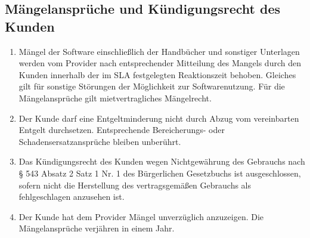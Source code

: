 \documentclass{terms}
\begin{document}
\subsection{Mängelansprüche und Kündigungsrecht des Kunden}
\begin{enumerate}
\item Mängel der Software einschließlich der Handbücher und sonstiger Unterlagen werden vom Provider nach entsprechender Mitteilung des Mangels durch den Kunden innerhalb der im SLA festgelegten Reaktionszeit behoben. Gleiches gilt für sonstige Störungen der Möglichkeit zur Softwarenutzung. Für die Mängelansprüche gilt mietvertragliches Mängelrecht.
\item Der Kunde darf eine Entgeltminderung nicht durch Abzug vom vereinbarten Entgelt durchsetzen. Entsprechende Bereicherungs- oder Schadensersatzansprüche bleiben unberührt.
\item Das Kündigungsrecht des Kunden wegen Nichtgewährung des Gebrauchs nach § 543 Absatz 2 Satz 1 Nr. 1 des Bürgerlichen Gesetzbuchs ist ausgeschlossen, sofern nicht die Herstellung des vertragsgemäßen Gebrauchs als fehlgeschlagen anzusehen ist.
\item Der Kunde hat dem Provider Mängel unverzüglich anzuzeigen. Die Mängelansprüche verjähren in einem Jahr.
\end{enumerate}
\end{document}
